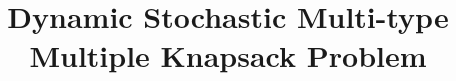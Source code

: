 \documentclass{article}
\title{Dynamic Stochastic Multi-type Multiple Knapsack Problem}
\begin{document}
\maketitle{}





















\end{document}
